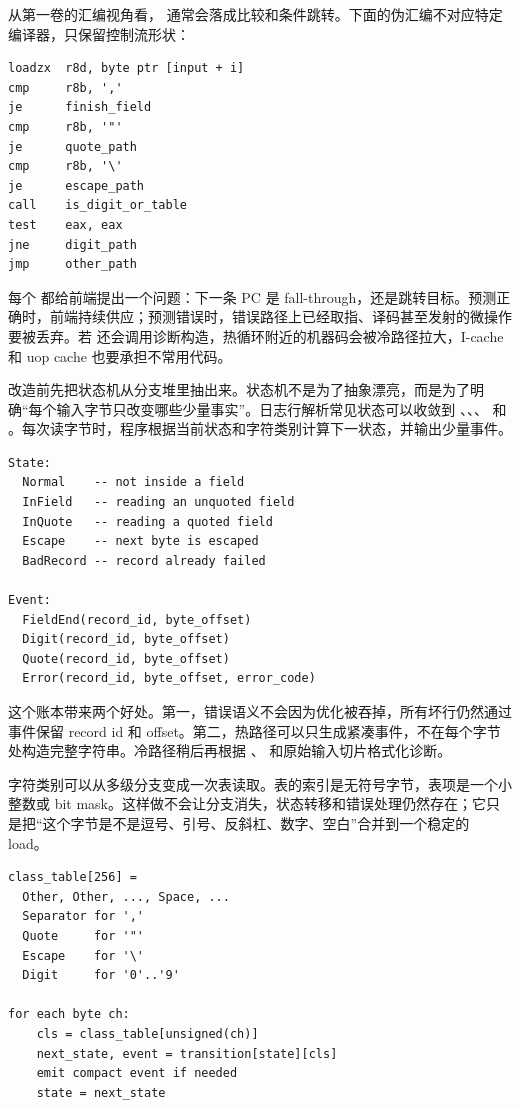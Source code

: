 从第一卷的汇编视角看， 通常会落成比较和条件跳转。下面的伪汇编不对应特定编译器，只保留控制流形状：

\begin{lstlisting}[numbers=none,caption={字符分类在机器层面的分支形状}]
loadzx  r8d, byte ptr [input + i]
cmp     r8b, ','
je      finish_field
cmp     r8b, '"'
je      quote_path
cmp     r8b, '\'
je      escape_path
call    is_digit_or_table
test    eax, eax
jne     digit_path
jmp     other_path
\end{lstlisting}

每个  都给前端提出一个问题：下一条 PC 是 fall-through，还是跳转目标。预测正确时，前端持续供应；预测错误时，错误路径上已经取指、译码甚至发射的微操作要被丢弃。若  还会调用诊断构造，热循环附近的机器码会被冷路径拉大，I-cache 和 uop cache 也要承担不常用代码。

改造前先把状态机从分支堆里抽出来。状态机不是为了抽象漂亮，而是为了明确“每个输入字节只改变哪些少量事实”。日志行解析常见状态可以收敛到 、、、 和 。每次读字节时，程序根据当前状态和字符类别计算下一状态，并输出少量事件。

\begin{lstlisting}[numbers=none,caption={解析状态机的语义账本}]
State:
  Normal    -- not inside a field
  InField   -- reading an unquoted field
  InQuote   -- reading a quoted field
  Escape    -- next byte is escaped
  BadRecord -- record already failed

Event:
  FieldEnd(record_id, byte_offset)
  Digit(record_id, byte_offset)
  Quote(record_id, byte_offset)
  Error(record_id, byte_offset, error_code)
\end{lstlisting}

这个账本带来两个好处。第一，错误语义不会因为优化被吞掉，所有坏行仍然通过  事件保留 record id 和 offset。第二，热路径可以只生成紧凑事件，不在每个字节处构造完整字符串。冷路径稍后再根据 、 和原始输入切片格式化诊断。

字符类别可以从多级分支变成一次表读取。表的索引是无符号字节，表项是一个小整数或 bit mask。这样做不会让分支消失，状态转移和错误处理仍然存在；它只是把“这个字节是不是逗号、引号、反斜杠、数字、空白”合并到一个稳定的 load。

\begin{lstlisting}[numbers=none,caption={分类表把多级判断换成数据读取}]
class_table[256] =
  Other, Other, ..., Space, ...
  Separator for ','
  Quote     for '"'
  Escape    for '\'
  Digit     for '0'..'9'

for each byte ch:
    cls = class_table[unsigned(ch)]
    next_state, event = transition[state][cls]
    emit compact event if needed
    state = next_state
\end{lstlisting}

